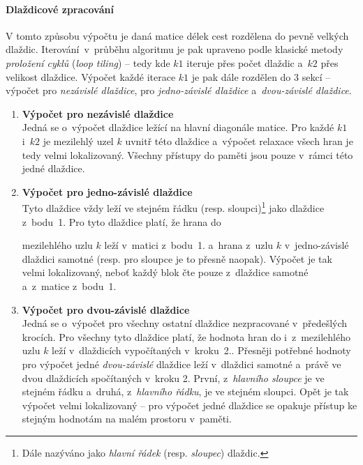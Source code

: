 \paragraph{Dlaždicové zpracování}
V tomto způsobu výpočtu je daná matice délek cest rozdělena do pevně velkých dlaždic. Iterování~v~průběhu algoritmu je pak
upraveno podle klasické metody \emph{proložení cyklů} (\emph{loop tiling}) -- tedy kde $k1$ iteruje přes počet dlaždic 
a~$k2$ přes velikost dlaždice. Výpočet každé iterace $k1$ je pak dále rozdělen do
3 sekcí -- výpočet pro \emph{nezávislé dlaždice}, pro \emph{jedno-závislé dlaždice} a~\emph{dvou-závislé dlaždice}.
\begin{enumerate}
    \item \textbf{Výpočet pro nezávislé dlaždice} \label{cuda:dlazdice:nezavisle} \\
        Jedná se o~výpočet dlaždice ležící na hlavní diagonále matice. Pro každé $k1$ i~$k2$ je mezilehlý uzel $k$ uvnitř této
        dlaždice a~výpočet relaxace všech hran je tedy velmi lokalizovaný. Všechny přístupy do paměti jsou pouze v~rámci této jedné dlaždice.

    \item \textbf{Výpočet pro jedno-závislé dlaždice} \label{cuda:dlazdice:jednozavisle} \\ 
        Tyto dlaždice vždy leží ve stejném řádku (resp. sloupci)\footnote{Dále nazýváno jako \emph{hlavní řádek} (resp.
        \emph{sloupec}) dlaždic.} jako dlaždice z~bodu~1. Pro tyto dlaždice platí, že hrana do 


        mezilehlého uzlu $k$ leží v~matici z~bodu~1. a~hrana z~uzlu $k$ v~jedno-závislé dlaždici samotné (resp. pro sloupce je to 
        přesně naopak). Vý\-po\-čet je tak velmi lokalizovaný, neboť každý blok čte pouze z~dlaždice samotné a~z~matice z~bodu~1.

    \item \textbf{Výpočet pro dvou-závislé dlaždice} \label{cuda:dlazdice:dvouzavisle} \\
        Jedná se o~výpočet pro všechny ostatní dlaždice nezpracované v~pře\-deš\-lých krocích. Pro všechny tyto dlaždice platí, že 
        hodnota hran do i~z~me\-zi\-leh\-lé\-ho uzlu $k$ leží v~dlaždicích vypočítaných v~kroku~2.. Přesněji potřebné hodnoty pro výpočet
        jedné \emph{dvou-závislé} dlaždice leží v~dlaždici samotné a~právě ve dvou dlaždicích spočítaných v~kroku 2. První, 
        z~\emph{hlavního sloupce} je ve stejném řádku a~druhá, z~\emph{hlavního řádku}, je ve stejném sloupci. Opět je tak 
        výpočet velmi lokalizovaný -- pro výpočet jedné dlaždice se opakuje přístup ke stejným hodnotám na malém prostoru v~paměti.

\end{enumerate}

